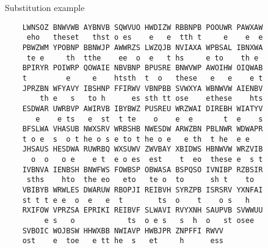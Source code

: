 \documentclass[8pt]{beamer}
\theoremstyle{plain}
\begin{document}
\begin{frame}[fragile]{Substitution example}
\begin{center}
\begin{BVerbatim}
    LWNSOZ BNWVWB AYBNVB SQWVUO HWDIZW RBBNPB POOUWR PAWXAW
     eho   theset   thst o es    e   e  tth t     e    e  e
    PBWZWM YPOBNP BBNWJP AWWRZS LWZQJB NVIAXA WPBSAL IBNXWA
     te e     th  tthe    ee  o  e   t hs     e to    th e 
    BPIRYR POIWRP QOWAIE NBVBNP BPUSRE BNWVWP AWOIHW OIQWAB
    t         e     e    htsth  t  o   these   e   e    e t
    JPRZBN WFYAVY IBSHNP FFIRWV VBNPBB SVWXYA WBNWVW AIENBV
        th e   s   to h      es sth tt ose    ethese    hts
    ESDWAR UWRBVP AWIRVB IBYBWZ PUSREU WRZWAI DIREBH WIATYV
       e    e ts   e  st  t te    o    e  e       t  e    s
    BFSLWA VHASUB NWXSRV WRBSHB NWESDW ARWZBN PBLNWR WDWAPR
    t o e  s  o t he o s e to t he o e   e th  t he  e e   
    JHSAUS HESDWA RUWRBQ WXSUWV ZWVBAY XBIDWS HBNWVW WRZVIB
      o  o   o e    e t  e o es  est    t  eo  these e  s t
    IVBNVA IENBSH BNWFWS FOWBSP OBWASA BSPQSO IVNIBP RZBSIR
     sths    hto  the eo   eto   te o  to      sh t    to  
    VBIBYB WRWLES DWARUW RBOPJI REIBVH SYRZPB ISRSRV YXNFAI
    st t t e e  o  e   e  t        ts  o    t    o s   h   
    RXIFOW VPRZSA EPRIKI REIBVF SLWAVI RVYXNH SAUPVB SVWWUU
         e s   o            ts  o e s   s  h  o   st osee  
    SVBOIC WOJBSW HHWXBB NWIAVP HWBJPR ZNPFFI RWVV
    ost    e  toe   e tt he  s   et     h      ess   
\end{BVerbatim}
\end{center}

\end{frame}
\end{document}
